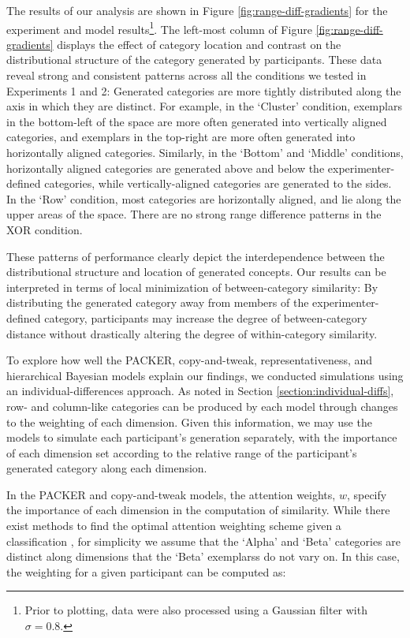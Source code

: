 \documentclass[12pt]{article}
\begin{document}
\begin{flushleft}
The results of our analysis are shown in Figure \ref{fig:range-diff-gradients}
for the experiment and model results\footnote{Prior to plotting, data were also
processed using a Gaussian filter with $\sigma = 0.8$.}. The left-most column of
Figure \ref{fig:range-diff-gradients} displays the effect of category location
and contrast on the distributional structure of the category generated by
participants. These data reveal strong and consistent patterns across all the
conditions we tested in Experiments 1 and 2: Generated categories are more
tightly distributed along the axis in which they are distinct. For example, in
the `Cluster' condition, exemplars in the bottom-left of the space are more
often generated into vertically aligned categories, and exemplars in the
top-right are more often generated into horizontally aligned categories.
Similarly, in the `Bottom' and `Middle' conditions, horizontally aligned
categories are generated above and below the experimenter-defined categories,
while vertically-aligned categories are generated to the sides. In the `Row'
condition, most categories are horizontally aligned, and lie along the upper
areas of the space. There are no strong range difference patterns in the XOR
condition.

These patterns of performance clearly depict the interdependence between the
distributional structure and location of generated concepts. Our results can be
interpreted in terms of local minimization of between-category similarity: By
distributing the generated category away from members of the
experimenter-defined category, participants may increase the degree of
between-category distance without drastically altering the degree of
within-category similarity.

To explore how well the PACKER, copy-and-tweak, representativeness, and
hierarchical Bayesian models explain our findings, we conducted simulations
using an individual-differences approach. As noted in Section
\ref{section:individual-diffs}, row- and column-like categories can be produced
by each model through changes to the weighting of each dimension. Given this
information, we may use the models to simulate each participant's generation
separately, with the importance of each dimension set according to the relative
range of the participant's generated category along each dimension.

In the PACKER and copy-and-tweak models, the attention weights, $w$, specify the
importance of each dimension in the computation of similarity. While there exist
methods to find the optimal attention weighting scheme given a classification
\citep[see][]{vanpaemel2012using}, for simplicity we assume that the `Alpha' and
`Beta' categories are distinct along dimensions that the `Beta' exemplarss do
not vary on. In this case, the weighting for a given participant can be computed
as:


\end{flushleft}
\end{document}
